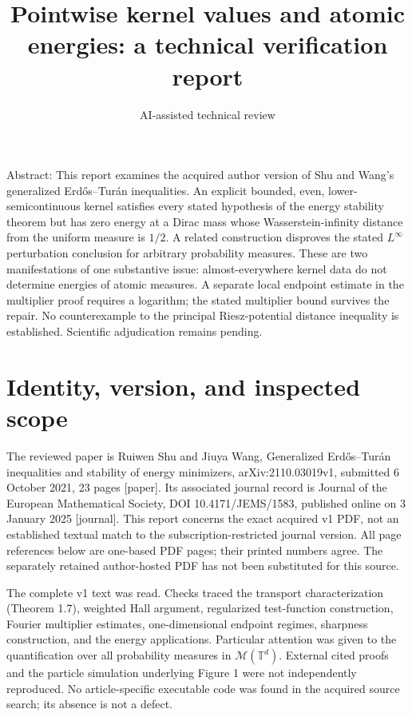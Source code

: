 \documentclass[10pt]{article}
\title{Pointwise kernel values and atomic energies:
a technical verification report}
\author{AI-assisted technical review}
\date{}
\begin{document}
\maketitle
Abstract: This report examines the acquired author version of Shu and Wang’s generalized Erdős–Turán inequalities. An explicit bounded, even, lower-semicontinuous kernel satisfies every stated hypothesis of the energy stability theorem but has zero energy at a Dirac mass whose Wasserstein-infinity distance from the uniform measure is \(1/2\). A related construction disproves the stated \(L^\infty\) perturbation conclusion for arbitrary probability measures. These are two manifestations of one substantive issue: almost-everywhere kernel data do not determine energies of atomic measures. A separate local endpoint estimate in the multiplier proof requires a logarithm; the stated multiplier bound survives the repair. No counterexample to the principal Riesz-potential distance inequality is established. Scientific adjudication remains pending.\par
\section*{Identity, version, and inspected scope}
The reviewed paper is Ruiwen Shu and Jiuya Wang, Generalized Erdős–Turán inequalities and stability of energy minimizers, arXiv:2110.03019v1, submitted 6 October 2021, 23 pages [paper]. Its associated journal record is Journal of the European Mathematical Society, DOI 10.4171/JEMS/1583, published online on 3 January 2025 [journal]. This report concerns the exact acquired v1 PDF, not an established textual match to the subscription-restricted journal version. All page references below are one-based PDF pages; their printed numbers agree. The separately retained author-hosted PDF has not been substituted for this source.\par
The complete v1 text was read. Checks traced the transport characterization (Theorem 1.7), weighted Hall argument, regularized test-function construction, Fourier multiplier estimates, one-dimensional endpoint regimes, sharpness construction, and the energy applications. Particular attention was given to the quantification over all probability measures in \(\mathcal M(\mathbb T^d)\). External cited proofs and the particle simulation underlying Figure 1 were not independently reproduced. No article-specific executable code was found in the acquired source search; its absence is not a defect.\par
\end{document}
